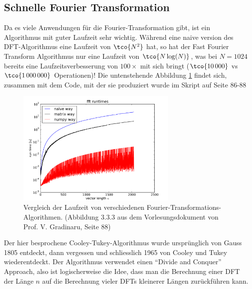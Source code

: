 
\newsection
\subsection{Schnelle Fourier Transformation}
Da es viele Anwendungen für die Fourier-Transformation gibt, ist ein Algorithmus mit guter Laufzeit sehr wichtig.
Während eine naive version des DFT-Algorithmus eine Laufzeit von $\tco{N^2}$ hat,
so hat der Fast Fourier Transform Algorithmus nur eine Laufzeit von $\tco{N \log(N)}$,
was bei $N = 1024$ bereits eine Laufzeitsverbesserung von $100\times$ mit sich bringt ($\tco{10\,000}$ vs $\tco{1\,000\,000}$ Operationen)!
Die untenstehende Abbildung \ref{fig:trigo-interp-fft-runtimes} findet sich, zusammen mit dem Code,
mit der sie produziert wurde im Skript auf Seite 86-88

\begin{figure}[h!]
    \begin{center}
        \includegraphics[width=0.7\textwidth]{assets/01_interpolation/01_trigonometric/fft-runtimes.png}
    \end{center}
    \caption{Vergleich der Laufzeit von verschiedenen Fourier-Transformations-Algorithmen.
    (Abbildung 3.3.3 aus dem Vorlesungsdokument von Prof. V. Gradinaru, Seite 88)}
    \label{fig:trigo-interp-fft-runtimes}
\end{figure}

Der hier besprochene Cooley-Tukey-Algorithmus wurde ursprünglich von Gauss 1805 entdeckt, dann vergessen und schliesslich 1965 von Cooley und Tukey wiederentdeckt.
Der Algorithmus verwendet einen ``Divide and Conquer'' Approach, also ist logischerweise die Idee,
dass man die Berechnung einer DFT der Länge $n$ auf die Berechnung vieler DFTs kleinerer Längen zurückführen kann.

